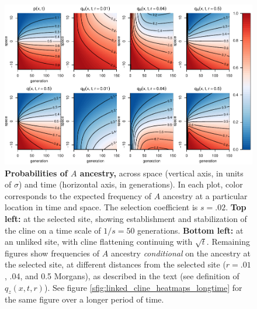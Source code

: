 \documentclass[11pt,letterpaper]{article}
\begin{document}
\begin{figure}
    \includegraphics{figs/linked-frequencies}
    \caption{
        \textbf{Probabilities of $A$ ancestry,}
        across space (vertical axis, in units of $\sigma$) 
        and time (horizontal axis, in generations).
        In each plot, color corresponds to the expected frequency of $A$ ancestry
        at a particular location in time and space.
        The selection coefficient is $s=.02$.
        \textbf{Top left:} at the selected site, showing establishment and stabilization of the cline
        on a time scale of $1/s=50$ generations.
        \textbf{Bottom left:} at an unliked site,
        with cline flattening continuing with $\sqrt{t}$.
        Remaining figures show frequencies of $A$ ancestry \emph{conditional}
        on the ancestry at the selected site,
        at different distances from the selected site ($r=.01$, .04, and 0.5 Morgans),
        as described in the text (see definition of $q_z(x,t,r)$).
        See figure \ref{sfig:linked_cline_heatmaps_longtime}
        for the same figure over a longer period of time.
    }
    \label{fig:linked_cline_heatmaps}
\end{figure}
\end{document}
